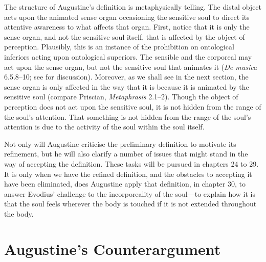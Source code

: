 \documentclass[12pt]{article}
\begin{document}
The structure of Augustine's definition is metaphysically telling. The distal object acts upon the animated sense organ occasioning the sensitive soul to direct its attentive awareness to what affects that organ. First, notice that it is only the sense organ, and not the sensitive soul itself, that is affected by the object of perception. Plausibly, this is an instance of the prohibition on ontological inferiors acting upon ontological superiors. The sensible and the corporeal may act upon the sense organ, but not the sensitive soul that animates it (\emph{De musica} 6.5.8–10; see \citealt{Silva:2014bh} for discussion). Moreover, as we shall see in the next section, the sense organ is only affected in the way that it is because it is animated by the sensitive soul (compare Priscian, \emph{Metaphrasis} 2.1--2). Though the object of perception does not act upon the sensitive soul, it is not hidden from the range of the soul's attention. That something is not hidden from the range of the soul’s attention is due to the activity of the soul within the soul itself.

Not only will Augustine criticise the preliminary definition to motivate its refinement, but he will also clarify a number of issues that might stand in the way of accepting the definition. These tasks will be pursued in chapters 24 to 29. It is only when we have the refined definition, and the obstacles to accepting it have been eliminated, does Augustine apply that definition, in chapter 30, to answer Evodius' challenge to the incorporeality of the soul---to explain how it is that the soul feels wherever the body is touched if it is not extended throughout the body.



\section{Augustine's Counterargument} %
\label{sec:augustine_s_counterargument}
\end{document}
